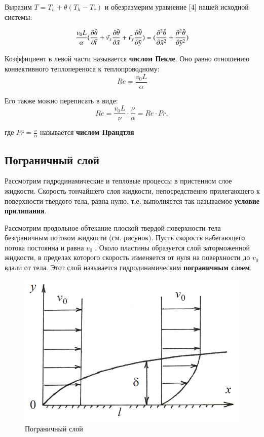 \bigskip
Выразим $T = T_h + \theta (T_h - T_c)$ и обезразмерим уравнение [4] нашей исходной системы:

$$\frac{v_0L}{\alpha} (\frac{\partial \Tilde{\theta}}{\partial \Tilde{t}} + \Tilde{v_x}\frac{\partial \Tilde{\theta}}{\partial \Tilde{x}} + \Tilde{v_y}\frac{\partial \Tilde{\theta}}{\partial \Tilde{y}}) = (\frac{\partial^2 \Tilde{\theta}}{\partial \Tilde{x}^2} + \frac{\partial^2 \Tilde{\theta}}{\partial \Tilde{y}^2})$$

Коэффициент в левой части называется \textbf{числом Пекле}. Оно равно отношению конвективного теплопереноса к теплопроводному:
$$Re = \frac{v_0L}{\alpha}$$

Его также можно переписать в виде:
$$Re = \frac{v_0L}{\nu} \cdot \frac{\nu}{\alpha} = Re \cdot Pr,$$

где $Pr = \frac{\nu}{\alpha}$ называется \textbf{числом Прандтля}


\subsection{Пограничный слой}

Рассмотрим гидродинамические и тепловые процессы в пристенном слое жидкости. Скорость тончайшего слоя жидкости, непосредственно прилегающего к поверхности твердого тела, равна нулю, т.е. выполняется так называемое \textbf{условие прилипания}. 

Рассмотрим продольное обтекание плоской твердой поверхности тела безграничным потоком жидкости (см. рисунок). Пусть скорость набегающего потока постоянна и равна $v_0$ . Около пластины образуется слой заторможенной жидкости, в пределах которого скорость изменяется от нуля на поверхности до $v_0$ вдали от тела. Этот слой называется гидродинамическим \textbf{пограничным слоем}.

\begin{figure}[h]
    \centering
    \includegraphics[scale=0.5]{17/fig_17_1.png}
    \caption{Пограничный слой}
\end{figure}

